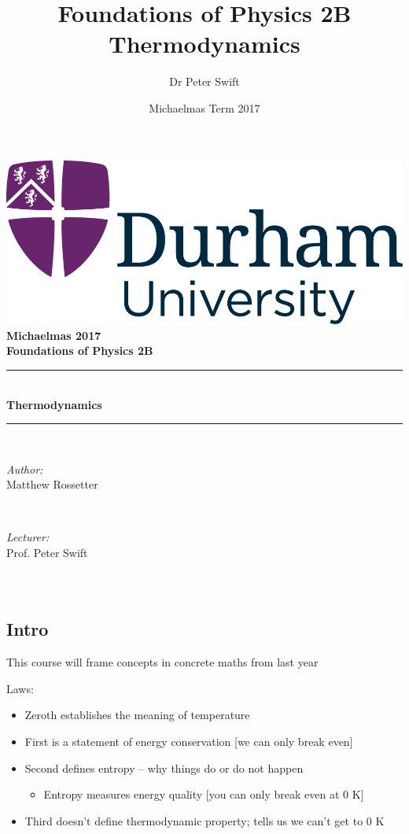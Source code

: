 \documentclass[a4paper, 11pt, normalem]{report}
\title{Foundations of Physics 2B \\ Thermodynamics \vspace{-20pt}}
\author{Dr Peter Swift}
\date{\vspace{-15pt}Michaelmas Term 2017}
\begin{document}
\begin{titlepage}
    \newcommand{\HRule}{\rule{\linewidth}{0.5mm}}
    \center
    {\includegraphics[scale=0.5]{../../logo0.png}\hfill{\Large\bfseries Michaelmas 2017}}\\[2.5cm]
    {\LARGE\bfseries Foundations of Physics 2B}\\[1.5cm]
    \HRule \\[0.7cm]
    {\huge\bfseries Thermodynamics}\\[0.4cm]
    \HRule \\[1.5cm]

    \begin{minipage}{0.4\textwidth}
        \begin{flushleft} \large
            \emph{Author:} \\ Matthew Rossetter
        \end{flushleft}
    \end{minipage}~
    \begin{minipage}{0.4\textwidth}
        \begin{flushright} \large
            \emph{Lecturer:} \\ Prof. Peter Swift
        \end{flushright}
    \end{minipage}\\[2cm]
    \vfill
\end{titlepage}
\tableofcontents

\chapter{}
\section{Intro}
This course will frame concepts in concrete maths from last year

Laws:
\begin{itemize}
  \item Zeroth establishes the meaning of temperature
  \item First is a statement of energy conservation [we can only break even]
  \item Second defines entropy -- why things do or do not happen
  \begin{itemize}
    \item Entropy measures energy quality [you can only break even at 0 K]
  \end{itemize}
  \item Third doesn't define thermodynamic property; tells us we can't get to 0 K
\end{itemize}
\end{document}
